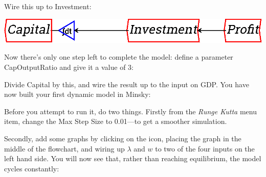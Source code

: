 \begin{center}
\end{center}

Wire this up to Investment:

\begin{center}
\includegraphics{images/NewItem104.eps}
\end{center}

Now there's only one step left to complete the model: define a
parameter CapOutputRatio and give it a value of 3:

\begin{center}
\end{center}


Divide Capital by this, and wire the result up to the input on
GDP. You have now built your first dynamic model in Minsky: 


Before you attempt to run it, do two things. Firstly from the {\em Runge
Kutta} menu item, change the Max Step Size to 0.01---to get a smoother
simulation. 

\begin{center}
\end{center}

Secondly, add some graphs by clicking on the
 icon, placing the graph
in the middle of the flowchart, and wiring up $\lambda$ and $w$ to two of
the four inputs on the left hand side. You will now see that, rather
than reaching equilibrium, the model cycles constantly:

\begin{center}
\end{center}

